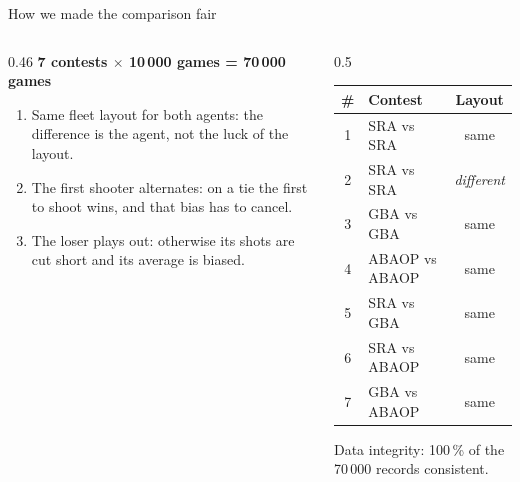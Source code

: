 \documentclass[aspectratio=169,11pt]{beamer}
\begin{document}
\begin{frame}{How we made the comparison fair}
\begin{columns}[T]
\begin{column}{0.46\textwidth}
\textbf{7 contests $\times$ 10\,000 games = 70\,000 games}
\vspace{2mm}
\begin{enumerate}\small\itemsep3pt
    \item \alert{Same fleet layout} for both agents: the difference is the agent, not the luck of the layout.
    \item \alert{The first shooter alternates}: on a tie the first to shoot wins, and that bias has to cancel.
    \item \alert{The loser plays out}: otherwise its shots are cut short and its average is biased.
\end{enumerate}
\end{column}
\begin{column}{0.5\textwidth}
\centering\scriptsize
\begin{tabular}{@{}clc@{}}
\toprule
\# & Contest & Layout \\
\midrule
1 & SRA vs SRA & same \\
2 & SRA vs SRA & \emph{different} \\
3 & GBA vs GBA & same \\
4 & ABAOP vs ABAOP & same \\
5 & SRA vs GBA & same \\
6 & SRA vs ABAOP & same \\
7 & GBA vs ABAOP & same \\
\bottomrule
\end{tabular}
\vspace{3mm}

\footnotesize Data integrity: 100\,\% of the 70\,000 records consistent.
\end{column}
\end{columns}
\end{frame}
\end{document}
